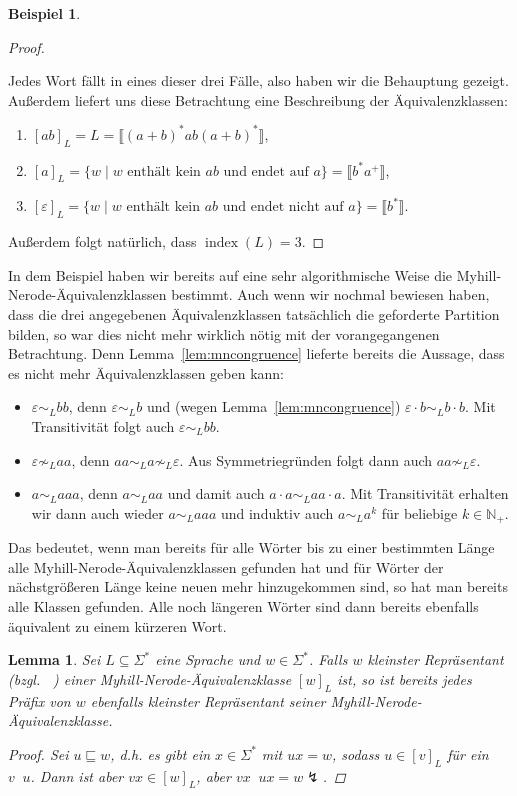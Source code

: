 \documentclass[11pt, a4paper]{article}
\theoremstyle{definition}
\newtheorem{example}[definition]{Beispiel}
\theoremstyle{plain}
\newtheorem{lemma}[definition]{Lemma}
\numberwithin{equation}{section}
\DeclareMathOperator{\ind}{index}
\DeclareMathOperator{\canon}{\prec_\text{cn}}
\begin{document}
\begin{example}
\begin{proof}
\begin{enumerate}[label=\arabic*)]
		\end{enumerate}
		Jedes Wort fällt in eines dieser drei Fälle, also haben wir die Behauptung gezeigt. Außerdem liefert uns diese Betrachtung eine Beschreibung der Äquivalenzklassen:
		\begin{enumerate}[label=\arabic*)]
			\item $[ab]_L = L = \llbracket (a+b)^\ast ab (a+b)^\ast \rrbracket$,
			\item $[a]_L = \{w \mid w \text{ enthält kein } ab \text{ und endet auf } a\} = \llbracket b^\ast a^+ \rrbracket$,
			\item $[\varepsilon]_L = \{w \mid w \text{ enthält kein } ab \text{ und endet nicht auf } a\} = \llbracket b^\ast \rrbracket$.
		\end{enumerate}
		Außerdem folgt natürlich, dass $\ind(L) = 3$.
	\end{proof}
\end{example}
In dem Beispiel haben wir bereits auf eine sehr algorithmische Weise die Myhill-Nerode-Äquivalenzklassen bestimmt. Auch wenn wir nochmal bewiesen haben, dass die drei angegebenen Äquivalenzklassen tatsächlich die geforderte Partition bilden, so war dies nicht mehr wirklich nötig mit der vorangegangenen Betrachtung. Denn Lemma~\ref{lem:mncongruence} lieferte bereits die Aussage, dass es nicht mehr Äquivalenzklassen geben kann:
\begin{itemize}
	\item $\varepsilon \sim_L bb$, denn $\varepsilon \sim_L b$ und (wegen Lemma~\ref{lem:mncongruence}) $\varepsilon \cdot b \sim_L b \cdot b$. Mit Transitivität folgt auch $\varepsilon \sim_L bb$.
	\item $\varepsilon \not\sim_L aa$, denn $aa \sim_L a \not\sim_L \varepsilon$. Aus Symmetriegründen folgt dann auch $aa \not\sim_L \varepsilon$.
	\item $a \sim_L aaa$, denn $a \sim_L aa$ und damit auch $a \cdot a \sim_L aa \cdot a$. Mit Transitivität erhalten wir dann auch wieder $a \sim_L aaa$ und induktiv auch $a \sim_L a^k$ für beliebige $k \in \mathbb{N}_+$.
\end{itemize}
Das bedeutet, wenn man bereits für alle Wörter bis zu einer bestimmten Länge alle Myhill-Nerode-Äquivalenzklassen gefunden hat und für Wörter der nächstgrößeren Länge keine neuen mehr hinzugekommen sind, so hat man bereits alle Klassen gefunden. Alle noch längeren Wörter sind dann bereits ebenfalls äquivalent zu einem kürzeren Wort. 
\begin{lemma}
	Sei $L \subseteq \Sigma^\ast$ eine Sprache und $w \in \Sigma^\ast$. Falls $w$ kleinster Repräsentant (bzgl. $\canon$) einer Myhill-Nerode-Äquivalenzklasse $[w]_L$ ist, so ist bereits jedes Präfix von $w$ ebenfalls kleinster Repräsentant seiner Myhill-Nerode-Äquivalenzklasse.
	\begin{proof}
		Sei $u \sqsubseteq w$, d.h. es gibt ein $x \in \Sigma^\ast$ mit $ux = w$, sodass $u \in [v]_L$ für ein $v \canon u$. Dann ist aber $vx \in [w]_L$, aber $vx \canon ux = w \lightning$.
	\end{proof}
\end{lemma}
\end{document}
